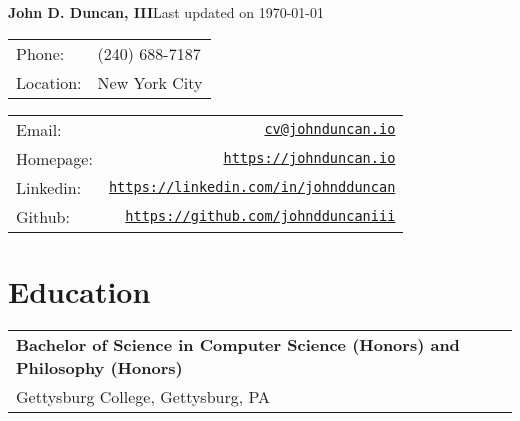 \documentclass[a4paper]{article}
\makeatletter
\def\name{John D. Duncan, III}
\def\email{cv@johnduncan.io}
\def\webpage{https://johnduncan.io}
\def\linkedin{https://linkedin.com/in/johndduncan}
\def\github{https://github.com/johndduncaniii}
\newcommand{\updateinfo}[1][\today]{{\color{gray}Last updated on #1}}
\makeatother
\begin{document}
{\huge \bfseries \name}\hfill \updateinfo\\

\begin{tabular}{ll}
	Phone: & (240) 688-7187\\
	Location: & New York City \\
\end{tabular}
\hfill
\begin{tabular}{lr}
	Email: & \href{mailto:\email}{\tt \email}\\
	Homepage: & \href{\webpage}{\tt \webpage}\\
	Linkedin: & \href{\linkedin}{\tt \linkedin} \\
	Github: & \href{\github}{\tt \github} \\
\end{tabular}

\section*{Education}

\begin{tabular}{ll}
  \textbf{Bachelor of Science in Computer Science {\footnotesize (Honors)} and Philosophy {\footnotesize (Honors)}} & \\
  Gettysburg College, Gettysburg, PA & \\
\end{tabular}
\end{document}
